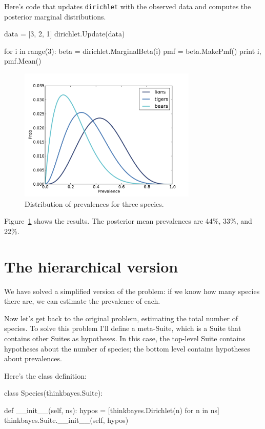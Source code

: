 \documentclass[12pt]{book}
\theoremstyle{exercise}
\begin{document}
Here's code that updates {\tt dirichlet} with the observed data and
computes the posterior marginal distributions.

\begin{code}
    data = [3, 2, 1]
    dirichlet.Update(data)

    for i in range(3):
        beta = dirichlet.MarginalBeta(i)
        pmf = beta.MakePmf()
        print i, pmf.Mean()
\end{code}

\begin{figure}
\centerline{\includegraphics[height=2.5in]{figs/species1.pdf}}
\caption{Distribution of prevalences for three species.}
\label{fig.species1}
\end{figure}

Figure~\ref{fig.species1} shows the results.  The posterior
mean prevalences are 44\%, 33\%, and 22\%.


\section{The hierarchical version}

We have solved a simplified version of the problem: if we
know how many species there are, we can estimate the prevalence
of each.

Now let's get back to the original problem, estimating the total
number of species.  To solve this problem I'll define a meta-Suite,
which is a Suite that contains other Suites as hypotheses.  In this
case, the top-level Suite contains hypotheses about the number of
species; the bottom level contains hypotheses about prevalences.

Here's the class definition:

\begin{code}
class Species(thinkbayes.Suite):

    def __init__(self, ns):
        hypos = [thinkbayes.Dirichlet(n) for n in ns]
        thinkbayes.Suite.__init__(self, hypos)
\end{code}
\end{document}
